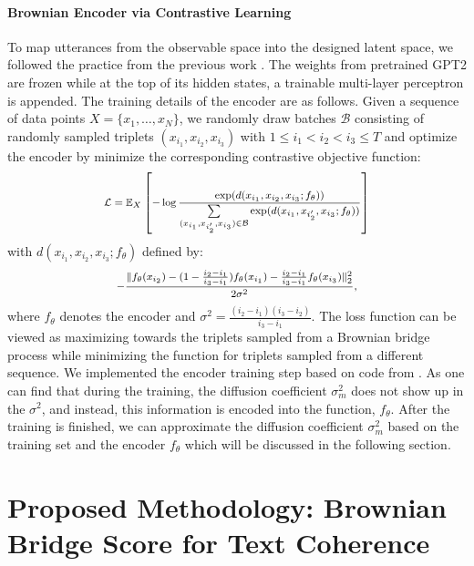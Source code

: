 \documentclass[letterpaper]{article} %
\begin{document}
\paragraph{Brownian Encoder via Contrastive Learning}
To map utterances from the observable space into the designed latent space, we followed the practice from the previous work \citep{wang2023language}. The weights from pretrained GPT2 \citep{radford2019language} are frozen while at the top of its hidden states, a trainable multi-layer perceptron is appended.
The training details of the encoder are as follows. Given a sequence of data points $X=\{x_1,\dots,x_N\}$, we randomly draw batches $\mathcal{B}$ consisting of randomly sampled triplets $(x_{i_1}, x_{i_2}, x_{i_3})$ with $1\le i_1 < i_2 < i_3 \le T$ and optimize the encoder by minimize the corresponding contrastive objective function:
\begin{equation*}
\footnotesize
\begin{aligned}
\mathcal{L} =\mathbb{E}_X\left[-\log \frac{\exp(d(x_{i_1}, x_{i_2}, x_{i_3}; f_\theta))}{\sum\limits_{(x_{i_1}, x_{i_2'},x_{i_3})\in \mathcal{B}}\exp(d(x_{i_1}, x_{i_2'},x_{i_3}; f_\theta))}\right]
\end{aligned}
\end{equation*}
with $d(x_{i_1}, x_{i_2},x_{i_3}; f_\theta)$ defined by:
\begin{equation*}
\footnotesize
\begin{aligned}
-\frac{\|f_\theta(x_{i_2}) - (1-\frac{i_2-i_1}{i_3-i_1})f_\theta(x_{i_1}) -\frac{i_2-i_1}{i_3-i_1}f_\theta (x_{i_3})\|_2^2}{2\sigma^2},
\end{aligned}
\end{equation*}
where $f_\theta$ denotes the encoder and $\sigma^2=\frac{(i_2-i_1)(i_3-i_2)}{i_3-i_1}$. The loss function can be viewed as maximizing towards the triplets sampled from a Brownian bridge process while minimizing the function for triplets sampled from a different sequence. We implemented the encoder training step based on code from \cite{wang2023language}. As one can find that during the training, the diffusion coefficient $\sigma^2_m$ does not show up in the  $\sigma^2$, and instead, this information is encoded into the function, $f_\theta$. After the training is finished, we can approximate the diffusion coefficient $\sigma^2_m$ based on the training set and the encoder $f_\theta$ which will be discussed in the following section. 

\section{Proposed Methodology: Brownian Bridge Score for Text Coherence}
\end{document}
